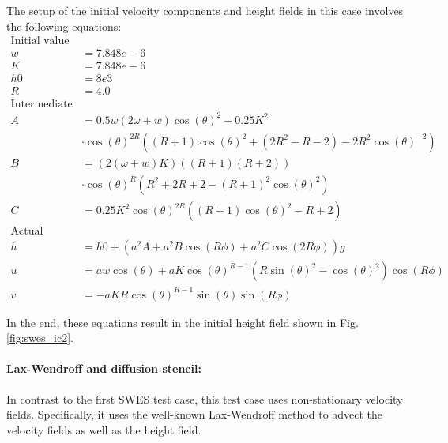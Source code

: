 The setup of the initial velocity components and height fields in this case involves the following equations:
\begin{equation}
\label{eq:swes_ic2_1}
\begin{split}
\text{Initial value constants:} \\
w &= 7.848e-6 \\
K &= 7.848e-6 \\
h0 &= 8e3 \\
R &= 4.0 \\
\text{Intermediate values:} \\
A &= 0.5 w \left(2 \omega + w \right) \cos \left( \theta \right)^2 + 0.25 K^2 \\
& \cdot \cos\left(\theta\right)^{2 R} \left( \left(R + 1\right) \cos \left( \theta \right)^2 + \left(2 R^2 - R - 2 \right) - 2 R^2 \cos \left(\theta \right)^{-2} \right) \\
B &= \left(2 \left(\omega + w\right) K\right) \left(\left(R + 1\right) \left(R + 2\right)\right) \\
& \cdot \cos\left(\theta \right) ^ R \left(R ^ 2 + 2 R + 2 - \left(R + 1\right) ^ 2 \cos\left(\theta\right) ^ 2\right) \\
C &= 0.25 K ^ 2 \cos\left(\theta\right) ^{2 R} \left(\left(R + 1\right) \cos\left(\theta\right) ^ 2 - R + 2 \right) \\
\text{Actual initial fields:} \\
h &= h0 + \left( a ^ 2 A + a ^ 2 B \cos\left(R \phi\right) + a ^ 2 C \cos \left(2 R \phi \right)\right)  g \\
u &= a w \cos\left(\theta\right) + a K\cos\left(\theta\right) ^ {R - 1} \left(R \sin\left(\theta\right) ^ 2 - \cos\left(\theta\right) ^ 2\right) \cos\left(R \phi\right) \\
v &= - a K R \cos\left(\theta\right) ^ {R - 1} \sin\left(\theta\right) \sin\left(R \phi\right)
\end{split}
\end{equation}


In the end, these equations result in the initial height field shown in Fig. \ref{fig:swes_ic2}.

\paragraph{Lax-Wendroff and diffusion stencil:}
In contrast to the first SWES test case, this test case uses non-stationary velocity fields.
Specifically, it uses the well-known Lax-Wendroff method to advect the velocity fields as well as the height field.

